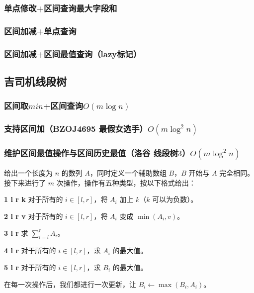\documentclass[twoside,a4paper]{article}
\begin{document}
\subsubsection{单点修改+区间查询最大字段和}


\subsubsection{区间加减+单点查询}


\subsubsection{区间加减+区间最值查询（lazy标记）}



\subsection{吉司机线段树}

\subsubsection{区间取$min$+区间查询$O(m \log n)$}


\subsubsection{支持区间加（BZOJ4695 最假女选手）$O(m \log ^{2}n)$}


\subsubsection{维护区间最值操作与区间历史最值（洛谷 线段树$3$）$O(m \log ^{2}n)$}
给出一个长度为 $n$ 的数列 $A$，同时定义一个辅助数组 $B$，$B$ 开始与 $A$ 完全相同。接下来进行了 $m$ 次操作，操作有五种类型，按以下格式给出：\par
\textbf{1 l r k} 对于所有的 $i\in[l,r]$，将 $A_i$ 加上 $k$（$k$ 可以为负数）。\par
\textbf{2 l r v} 对于所有的 $i\in[l,r]$，将 $A_i$ 变成 $\min(A_i,v)$。\par
\textbf{3 l r} 求 $\sum_{i=l}^{r}A_i$。\par
\textbf{4 l r} 对于所有的 $i\in[l,r]$，求 $A_i$ 的最大值。\par
\textbf{5 l r} 对于所有的 $i\in[l,r]$，求 $B_i$ 的最大值。\par
在每一次操作后，我们都进行一次更新，让 $B_i\gets\max(B_i,A_i)$。\par

\end{document}
